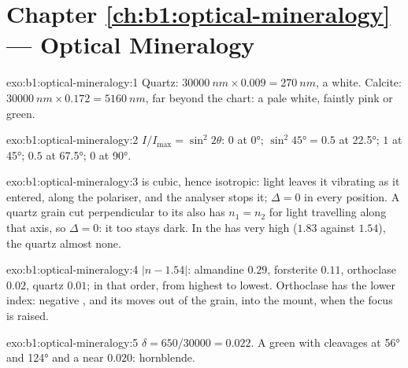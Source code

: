 \section*{Chapter \ref{ch:b1:optical-mineralogy} --- Optical Mineralogy}

\begin{solution}{exo:b1:optical-mineralogy:1}
Quartz: $\qty{30000}{nm}\times0.009 = \qty{270}{nm}$, a  white.
Calcite: $\qty{30000}{nm}\times0.172 = \qty{5160}{nm}$, far beyond the chart:
a pale  white, faintly pink or green.
\end{solution}

\begin{solution}{exo:b1:optical-mineralogy:2}
$I/I_{\max} = \sin^2 2\theta$: $0$ at \ang{0}; $\sin^2\ang{45} = 0.5$ at
\ang{22.5}; $1$ at \ang{45}; $0.5$ at \ang{67.5}; $0$ at \ang{90}.
\end{solution}

\begin{solution}{exo:b1:optical-mineralogy:3}
 is cubic, hence isotropic: light leaves it vibrating as it entered,
along the polariser, and the analyser stops it; $\Delta = 0$ in every
position. A quartz grain cut perpendicular to its  also has
$n_1 = n_2$ for light travelling along that axis, so $\Delta = 0$: it too stays
dark. In  the  has very high  ($1.83$
against $1.54$), the quartz almost none.
\end{solution}

\begin{solution}{exo:b1:optical-mineralogy:4}
$|n - 1.54|$: almandine $0.29$, forsterite $0.11$, orthoclase $0.02$, quartz
$0.01$;  in that order, from highest to lowest. Orthoclase has the lower
index: negative , and its  moves out of the grain, into the
mount, when the focus is raised.
\end{solution}

\begin{solution}{exo:b1:optical-mineralogy:5}
$\delta = 650/30000 = 0.022$. A green   with cleavages at
\ang{56} and \ang{124} and a  near $0.020$: hornblende.
\end{solution}


